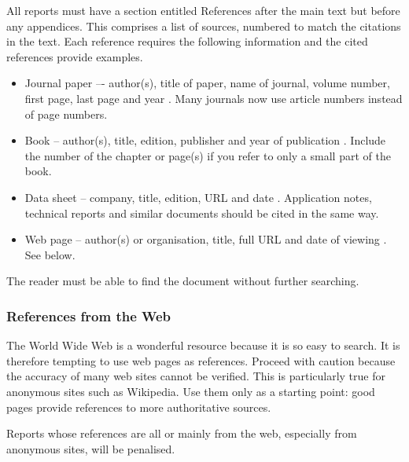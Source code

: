 All reports must have a section entitled References after the main text but
before any appendices. This comprises a list of sources, numbered to match the
citations in the text. Each reference requires the following information and the
cited references provide examples.

\begin{itemize}
    \item Journal paper {–-} author(s), title of paper, name of journal, volume
          number, first page, last page and year
          \autocite{fitzmaurice1987comparison}. Many journals now use article
          numbers instead of page numbers.
    \item Book {--} author(s), title, edition, publisher and year of publication
          \autocite{van2017writing}. Include the number of the chapter or
          page(s) if you refer to only a small part of the book.
    \item Data sheet {--} company, title, edition, URL and date
          \autocite{datasheet}. Application notes, technical reports and similar
          documents should be cited in the same way.
    \item Web page {--} author(s) or organisation, title, full URL and date of
          viewing \autocite{oxford}. See below.
\end{itemize}

The reader must be able to find the document without further searching.

\subsubsection{References from the Web}

The World Wide Web is a wonderful resource because it is so easy to search. It
is therefore tempting to use web pages as references. Proceed with caution
because the accuracy of many web sites cannot be verified. This is particularly
true for anonymous sites such as Wikipedia. Use them only as a starting point:
good pages provide references to more authoritative sources.

Reports whose references are all or mainly from the web, especially from
anonymous sites, will be penalised.